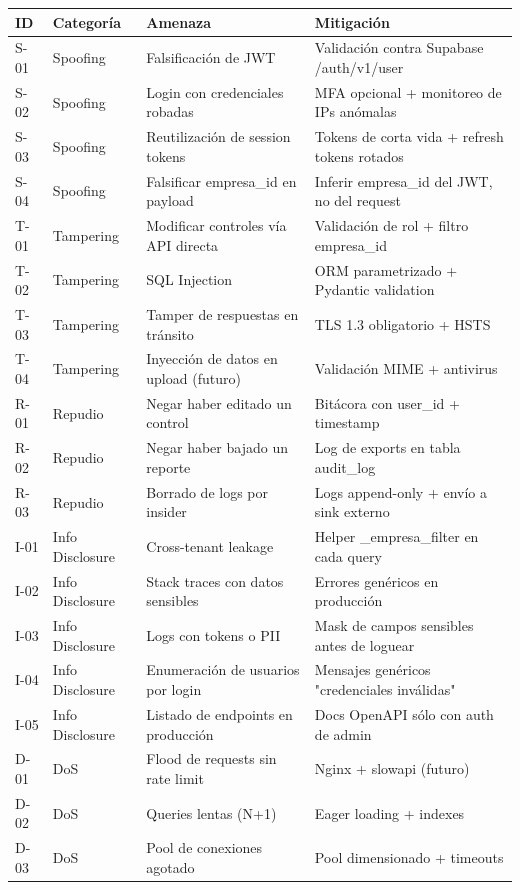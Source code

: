 \documentclass[12pt,a4paper,oneside]{article}
\begin{document}
\begin{longtable}{p{1cm}p{2cm}p{5cm}p{5cm}}
\toprule
\textbf{ID} & \textbf{Categoría} & \textbf{Amenaza} & \textbf{Mitigación} \\
\midrule
\endhead
S-01 & Spoofing & Falsificación de JWT & Validación contra Supabase /auth/v1/user \\
S-02 & Spoofing & Login con credenciales robadas & MFA opcional + monitoreo de IPs anómalas \\
S-03 & Spoofing & Reutilización de session tokens & Tokens de corta vida + refresh tokens rotados \\
S-04 & Spoofing & Falsificar empresa\_id en payload & Inferir empresa\_id del JWT, no del request \\
T-01 & Tampering & Modificar controles vía API directa & Validación de rol + filtro empresa\_id \\
T-02 & Tampering & SQL Injection & ORM parametrizado + Pydantic validation \\
T-03 & Tampering & Tamper de respuestas en tránsito & TLS 1.3 obligatorio + HSTS \\
T-04 & Tampering & Inyección de datos en upload (futuro) & Validación MIME + antivirus \\
R-01 & Repudio & Negar haber editado un control & Bitácora con user\_id + timestamp \\
R-02 & Repudio & Negar haber bajado un reporte & Log de exports en tabla audit\_log \\
R-03 & Repudio & Borrado de logs por insider & Logs append-only + envío a sink externo \\
I-01 & Info Disclosure & Cross-tenant leakage & Helper \_empresa\_filter en cada query \\
I-02 & Info Disclosure & Stack traces con datos sensibles & Errores genéricos en producción \\
I-03 & Info Disclosure & Logs con tokens o PII & Mask de campos sensibles antes de loguear \\
I-04 & Info Disclosure & Enumeración de usuarios por login & Mensajes genéricos "credenciales inválidas" \\
I-05 & Info Disclosure & Listado de endpoints en producción & Docs OpenAPI sólo con auth de admin \\
D-01 & DoS & Flood de requests sin rate limit & Nginx + slowapi (futuro) \\
D-02 & DoS & Queries lentas (N+1) & Eager loading + indexes \\
D-03 & DoS & Pool de conexiones agotado & Pool dimensionado + timeouts \\

\end{longtable}
\end{document}
